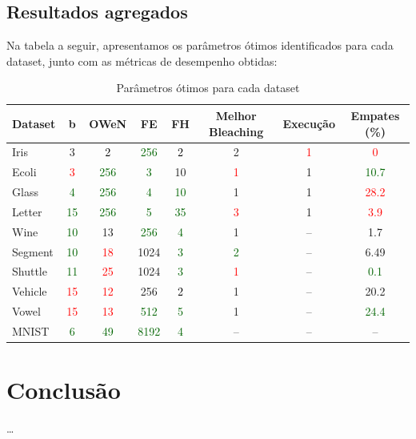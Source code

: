 \documentclass{article}
\begin{document}
\subsection{Resultados agregados}

Na tabela a seguir, apresentamos os parâmetros ótimos identificados para cada dataset, junto com as métricas de desempenho obtidas:

{\small
\begin{table}[H]
\caption{Parâmetros ótimos para cada dataset}
\renewcommand{\arraystretch}{1.1}
\begin{center}
\begin{tabular}{lccccccc}
\hline
\textbf{Dataset} & \textbf{b} & \textbf{OWeN} & \textbf{FE} & \textbf{FH} & \textbf{Melhor Bleaching} & \textbf{Execução} & \textbf{Empates (\%)} \\
\hline
Iris & 3 & \textcolor{black}{2} & \textcolor{darkgreen}{256} & \textcolor{black}{2} & 2 & \textcolor{red}{1} & \textcolor{red}{0} \\
Ecoli & \textcolor{red}{3} & \textcolor{darkgreen}{256} & \textcolor{darkgreen}{3} & 10 & \textcolor{red}{1} & 1 & \textcolor{darkgreen}{10.7} \\
Glass & \textcolor{darkgreen}{4} & \textcolor{darkgreen}{256} & \textcolor{darkgreen}{4} & \textcolor{darkgreen}{10} & 1 & 1 & \textcolor{red}{28.2} \\
Letter & \textcolor{darkgreen}{15} & \textcolor{darkgreen}{256} & \textcolor{darkgreen}{5} & \textcolor{darkgreen}{35} & \textcolor{red}{3} & 1 & \textcolor{red}{3.9} \\
Wine & \textcolor{darkgreen}{10} & 13 & \textcolor{darkgreen}{256} & \textcolor{darkgreen}{4} & 1 & -- & 1.7 \\
Segment & \textcolor{darkgreen}{10} & \textcolor{red}{18} & 1024 & \textcolor{darkgreen}{3} & \textcolor{darkgreen}{2} & -- & 6.49 \\
Shuttle & \textcolor{darkgreen}{11} & \textcolor{red}{25} & 1024 & \textcolor{darkgreen}{3} & \textcolor{red}{1} & -- & \textcolor{darkgreen}{0.1} \\
Vehicle & \textcolor{red}{15} & \textcolor{red}{12} & 256 & \textcolor{black}{2} & 1 & -- & 20.2 \\
Vowel & \textcolor{red}{15} & \textcolor{red}{13} & \textcolor{darkgreen}{512} & \textcolor{darkgreen}{5} & 1 & -- & \textcolor{darkgreen}{24.4} \\
MNIST & \textcolor{darkgreen}{6} & \textcolor{darkgreen}{49} & \textcolor{darkgreen}{8192} & \textcolor{darkgreen}{4} & -- & -- & -- \\
\hline
\end{tabular}
\end{center}
\end{table}
}

\section{Conclusão}

\ldots



\end{document}
